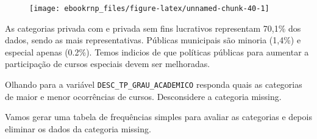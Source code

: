 \documentclass[11pt,]{style/krantz}
\theoremstyle{definition}
\theoremstyle{definition}
\theoremstyle{definition}
\theoremstyle{remark}
\let\BeginKnitrBlock\begin \let\EndKnitrBlock\end
\begin{document}
\begin{figure}[H]

{\centering \texttt{[image: ebookrnp\_files/figure-latex/unnamed-chunk-40-1]} 

}

\end{figure}

As categorias privada com e privada sem fins lucrativos representam 70,1\% dos dados, sendo as mais representativas. Públicas municipais são minoria (1,4\%) e especial apenas (0.2\%). Temos indicios de que políticas públicas para aumentar a participação de cursos especiais devem ser melhoradas.

\BeginKnitrBlock{exercise}
\protect\hypertarget{exr:unnamed-chunk-41}{}{\label{exr:unnamed-chunk-41} }Olhando para a variável \texttt{DESC\_TP\_GRAU\_ACADEMICO} responda quais as categorias de maior e menor ocorrências de cursos. Desconsidere a categoria missing.
\EndKnitrBlock{exercise}

\BeginKnitrBlock{solution}
\iffalse{} {Solução. } \fi{}Vamos gerar uma tabela de frequências simples para avaliar as categorias e depois eliminar os dados da categoria missing.
\EndKnitrBlock{solution}
\end{document}
